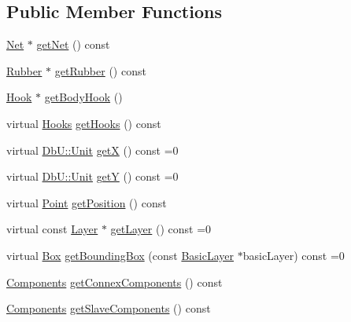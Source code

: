 \subsection*{Public Member Functions}
\begin{DoxyCompactItemize}
\item 
\hyperlink{classHurricane_1_1Net}{Net} $\ast$ \hyperlink{classHurricane_1_1Component_a1556ef77d6b89bfc17698d52ebde9791}{get\+Net} () const
\item 
\hyperlink{classHurricane_1_1Rubber}{Rubber} $\ast$ \hyperlink{classHurricane_1_1Component_ab701515debfdf1bf4142d4d917aaab1d}{get\+Rubber} () const
\item 
\hyperlink{classHurricane_1_1Hook}{Hook} $\ast$ \hyperlink{classHurricane_1_1Component_a19f06d7cad163bab3b97a13f4736c9d1}{get\+Body\+Hook} ()
\item 
virtual \hyperlink{namespaceHurricane_a9dcd9b74dc5e2b51bec7a13c25807e02}{Hooks} \hyperlink{classHurricane_1_1Component_a1fc513b9465b2b8c22f41d56bf775594}{get\+Hooks} () const
\item 
virtual \hyperlink{group__DbUGroup_ga4fbfa3e8c89347af76c9628ea06c4146}{Db\+U\+::\+Unit} \hyperlink{classHurricane_1_1Component_a0f8299ed73705fd4fbf56589dcc7e074}{getX} () const =0
\item 
virtual \hyperlink{group__DbUGroup_ga4fbfa3e8c89347af76c9628ea06c4146}{Db\+U\+::\+Unit} \hyperlink{classHurricane_1_1Component_a727da3f127c3a7a0a09468219f98c3e6}{getY} () const =0
\item 
virtual \hyperlink{classHurricane_1_1Point}{Point} \hyperlink{classHurricane_1_1Component_aa4e9a47c89fe701670ca34355195d519}{get\+Position} () const
\item 
virtual const \hyperlink{classHurricane_1_1Layer}{Layer} $\ast$ \hyperlink{classHurricane_1_1Component_ab451ef19059e6e5bbb77ae391d02a039}{get\+Layer} () const =0
\item 
virtual \hyperlink{classHurricane_1_1Box}{Box} \hyperlink{classHurricane_1_1Component_a69d527dbfda1cb58cdca27c6ac3f7796}{get\+Bounding\+Box} (const \hyperlink{classHurricane_1_1BasicLayer}{Basic\+Layer} $\ast$basic\+Layer) const =0
\item 
\hyperlink{namespaceHurricane_a7d26d99aeb5dd6d70d51bd35d2473e72}{Components} \hyperlink{classHurricane_1_1Component_a4acf996c03b0b94a186fad653ba578a6}{get\+Connex\+Components} () const
\item 
\hyperlink{namespaceHurricane_a7d26d99aeb5dd6d70d51bd35d2473e72}{Components} \hyperlink{classHurricane_1_1Component_af6d6b7c6b3cb18754cfa02bc5fb1e754}{get\+Slave\+Components} () const
\end{DoxyCompactItemize}

